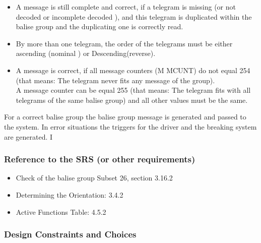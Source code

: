 \documentclass{template/openetcs_report}
\begin{document}
\begin{itemize}
\item A message is still complete and correct, if a telegram is missing (or not decoded or incomplete decoded ), and this telegram is duplicated within the balise group and the duplicating one is correctly read.
\item By more than one telegram, the order of the telegrams must be either ascending (nominal ) or Descending(reverse).\\
\item A message is correct, if  all message counters (M MCUNT) do not equal 254 (that means: The telegram never fits any message of the group).\\ A message counter can be equal 255 (that means: The telegram fits with all telegrams of the same balise group) and all other values must be the same.\\
\end{itemize}

For a correct balise group the balise group message is generated and passed to the system.
In error situations the triggers for the driver and the breaking system are generated.
I
\subsubsection{Reference to the SRS (or other requirements)}
\begin{itemize}
\item Check of the balise group Subset 26, section 3.16.2\\
\item Determining the Orientation: 3.4.2\\
\item  Active Functions Table: 4.5.2\\

\end{itemize}

\subsubsection{Design Constraints and Choices}
\end{document}
